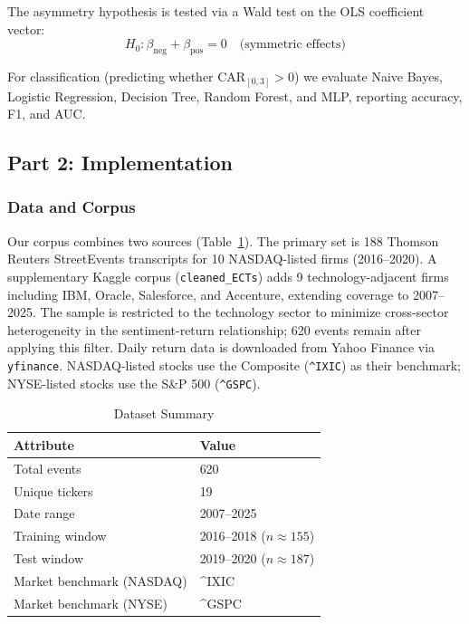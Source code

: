\documentclass[conference]{IEEEtran}
\begin{document}
The asymmetry hypothesis is tested via a Wald test on the OLS coefficient vector:
\begin{equation}
H_0: \beta_{\text{neg}} + \beta_{\text{pos}} = 0 \quad \text{(symmetric effects)}
\end{equation}

For classification (predicting whether CAR$_{[0,3]} > 0$) we evaluate
Naive Bayes, Logistic Regression, Decision Tree, Random Forest, and MLP,
reporting accuracy, F1, and AUC.

\subsection{Part 2: Implementation}

\subsubsection{Data and Corpus}

Our corpus combines two sources (Table~\ref{tab:dataset}).
The primary set is 188 Thomson Reuters StreetEvents transcripts for 10
NASDAQ-listed firms (2016--2020). A supplementary Kaggle corpus
(\texttt{cleaned\_ECTs}) adds 9 technology-adjacent firms including IBM,
Oracle, Salesforce, and Accenture, extending coverage to 2007--2025.
The sample is restricted to the technology sector to minimize cross-sector
heterogeneity in the sentiment-return relationship; 620 events remain after
applying this filter. Daily return data is downloaded from Yahoo Finance via
\texttt{yfinance}. NASDAQ-listed stocks use the Composite (\texttt{\^{}IXIC})
as their benchmark; NYSE-listed stocks use the S\&P 500 (\texttt{\^{}GSPC}).

\begin{table}[htbp]
\caption{Dataset Summary}
\label{tab:dataset}
\centering
\begin{tabular}{ll}
\toprule
Attribute & Value \\
\midrule
Total events & 620 \\
Unique tickers & 19 \\
Date range & 2007--2025 \\
Training window & 2016--2018 ($n \approx 155$) \\
Test window & 2019--2020 ($n \approx 187$) \\
Market benchmark (NASDAQ) & \^{}IXIC \\
Market benchmark (NYSE) & \^{}GSPC \\
\bottomrule
\end{tabular}
\end{table}
\end{document}
